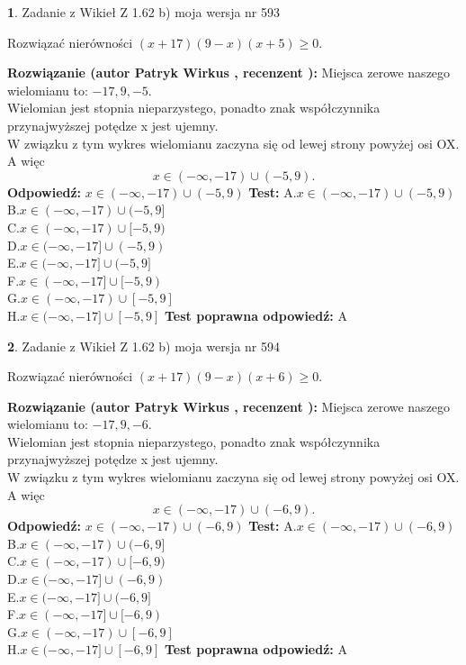 \documentclass[12pt, a4paper]{article}
\theoremstyle{definition} %
\newtheorem{zad}{}
\newcommand{\zadStart}[1]{\begin{zad}#1\newline}
\newcommand{\zadStop}{\end{zad}}
\newcommand{\rozwStart}[2]{\noindent \textbf{Rozwiązanie (autor #1 , recenzent #2): }\newline}
\newcommand{\rozwStop}{\newline}
\newcommand{\odpStart}{\noindent \textbf{Odpowiedź:}\newline}
\newcommand{\odpStop}{\newline}
\newcommand{\testStart}{\noindent \textbf{Test:}\newline}
\newcommand{\testStop}{\newline}
\newcommand{\kluczStart}{\noindent \textbf{Test poprawna odpowiedź:}\newline}
\newcommand{\kluczStop}{\newline}
\begin{document}
\zadStart{Zadanie z Wikieł Z 1.62 b) moja wersja nr 593}

Rozwiązać nierówności $(x+17)(9-x)(x+5)\ge0$.
\zadStop
\rozwStart{Patryk Wirkus}{}
Miejsca zerowe naszego wielomianu to: $-17, 9, -5$.\\
Wielomian jest stopnia nieparzystego, ponadto znak współczynnika przy\linebreak najwyższej potędze x jest ujemny.\\ W związku z tym wykres wielomianu zaczyna się od lewej strony powyżej osi OX. A więc $$x \in (-\infty,-17) \cup (-5,9).$$
\rozwStop
\odpStart
$x \in (-\infty,-17) \cup (-5,9)$
\odpStop
\testStart
A.$x \in (-\infty,-17) \cup (-5,9)$\\
B.$x \in (-\infty,-17) \cup (-5,9]$\\
C.$x \in (-\infty,-17) \cup [-5,9)$\\
D.$x \in (-\infty,-17] \cup (-5,9)$\\
E.$x \in (-\infty,-17] \cup (-5,9]$\\
F.$x \in (-\infty,-17] \cup [-5,9)$\\
G.$x \in (-\infty,-17) \cup [-5,9]$\\
H.$x \in (-\infty,-17] \cup [-5,9]$
\testStop
\kluczStart
A
\kluczStop



\zadStart{Zadanie z Wikieł Z 1.62 b) moja wersja nr 594}

Rozwiązać nierówności $(x+17)(9-x)(x+6)\ge0$.
\zadStop
\rozwStart{Patryk Wirkus}{}
Miejsca zerowe naszego wielomianu to: $-17, 9, -6$.\\
Wielomian jest stopnia nieparzystego, ponadto znak współczynnika przy\linebreak najwyższej potędze x jest ujemny.\\ W związku z tym wykres wielomianu zaczyna się od lewej strony powyżej osi OX. A więc $$x \in (-\infty,-17) \cup (-6,9).$$
\rozwStop
\odpStart
$x \in (-\infty,-17) \cup (-6,9)$
\odpStop
\testStart
A.$x \in (-\infty,-17) \cup (-6,9)$\\
B.$x \in (-\infty,-17) \cup (-6,9]$\\
C.$x \in (-\infty,-17) \cup [-6,9)$\\
D.$x \in (-\infty,-17] \cup (-6,9)$\\
E.$x \in (-\infty,-17] \cup (-6,9]$\\
F.$x \in (-\infty,-17] \cup [-6,9)$\\
G.$x \in (-\infty,-17) \cup [-6,9]$\\
H.$x \in (-\infty,-17] \cup [-6,9]$
\testStop
\kluczStart
A
\kluczStop
\end{document}
